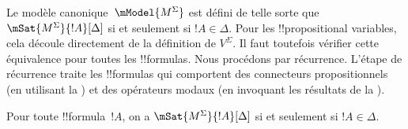 \documentclass[../../../include/open-logic-section]{subfiles}
\begin{document}


Le modèle canonique~$\mModel{M^\Sigma}$ est défini de telle sorte que
$\mSat{M^\Sigma}{!A}[\Delta]$ si et seulement si $!A \in \Delta$.
Pour les !!{propositional variable}s, cela découle directement de la
définition de $V^\Sigma$. Il faut toutefois vérifier cette équivalence
pour toutes les !!{formula}s. Nous procédons par récurrence. L'étape de
récurrence traite les !!{formula}s qui comportent des connecteurs
propositionnels (en utilisant la ) et
des opérateurs modaux (en invoquant les résultats de la
).

\begin{prop}
  Pour toute !!{formula}~$!A$, on a $\mSat{M^\Sigma}{!A}[\Delta]$ si et
  seulement si $!A \in \Delta$.
\end{prop}
\end{document}
